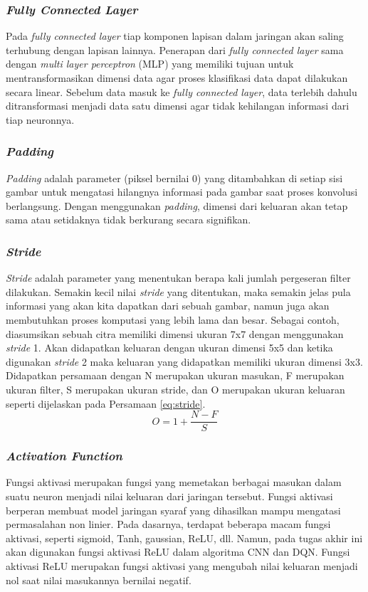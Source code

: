 \subsubsection{\textit{Fully Connected Layer}}
Pada \textit{fully connected layer }tiap komponen lapisan dalam jaringan akan saling terhubung dengan lapisan lainnya. Penerapan dari \textit{fully connected layer }sama dengan \textit{multi layer perceptron }(MLP) yang memiliki tujuan untuk mentransformasikan dimensi data agar proses klasifikasi data dapat dilakukan secara linear. Sebelum data masuk ke \textit{fully connected layer}, data terlebih dahulu ditransformasi menjadi data satu dimensi agar tidak kehilangan informasi dari tiap neuronnya.

\subsubsection{\textit{Padding}}
\textit{Padding }adalah parameter (piksel bernilai 0) yang ditambahkan di setiap sisi gambar untuk mengatasi hilangnya informasi pada gambar saat proses konvolusi berlangsung. Dengan menggunakan \textit{padding}, dimensi dari keluaran akan tetap sama atau setidaknya tidak berkurang secara signifikan. 

\subsubsection{\textit{Stride}}
\textit{Stride }adalah parameter yang menentukan berapa kali jumlah pergeseran filter dilakukan. Semakin kecil nilai \textit{stride }yang ditentukan, maka semakin jelas pula informasi yang akan kita dapatkan dari sebuah gambar, namun juga akan membutuhkan proses komputasi yang lebih lama dan besar. Sebagai contoh, diasumsikan sebuah citra memiliki dimensi ukuran 7x7 dengan menggunakan \textit{stride }1. Akan didapatkan keluaran dengan ukuran dimensi 5x5 dan ketika digunakan \textit{stride }2 maka keluaran yang didapatkan memiliki ukuran dimensi 3x3. Didapatkan persamaan dengan N merupakan ukuran masukan, F merupakan ukuran filter, S merupakan ukuran stride, dan O merupakan ukuran keluaran seperti dijelaskan pada Persamaan \ref{eq:stride}.
\begin{equation}
	\label{eq:stride}
	O = 1 +\frac{N-F}{S}
\end{equation}

\subsubsection{\textit{Activation Function}}
Fungsi aktivasi merupakan fungsi yang memetakan berbagai masukan dalam suatu neuron menjadi nilai keluaran dari jaringan tersebut. Fungsi aktivasi berperan membuat model jaringan syaraf yang dihasilkan mampu mengatasi permasalahan non linier. Pada dasarnya, terdapat beberapa macam fungsi aktivasi, seperti sigmoid, Tanh, gaussian, ReLU, dll. Namun, pada tugas akhir ini akan digunakan fungsi aktivasi ReLU dalam algoritma CNN dan DQN. Fungsi aktivasi ReLU merupakan fungsi aktivasi yang mengubah nilai keluaran menjadi nol saat nilai masukannya bernilai negatif.

